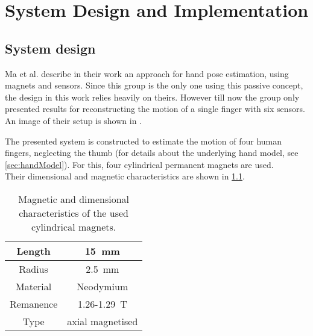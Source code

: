 \lhead[\chaptername~\thechapter]{\rightmark}

\rhead[\leftmark]{}

\lfoot[\thepage]{}

\cfoot{}

\rfoot[]{\thepage}

\chapter{System Design and Implementation} \label{cha:sysDesign}

\section{System design} \label{cha:design}

Ma et al. \cite{ma2010magnetic} describe in their work an approach for hand pose estimation, using magnets and sensors. Since this group is the only one using this passive concept, the design in this work relies heavily on theirs. However till now the group only presented results for reconstructing the motion of a single finger with six sensors. An image of their setup is shown in .

The presented system is constructed to estimate the motion of four human fingers, neglecting the thumb (for details about the underlying hand model, see \ref{sec:handModel}). For this, four cylindrical permanent magnets are used.\\
Their dimensional and magnetic characteristics are shown in \ref{tab:magDimensions}.
\begin{table}[h]
\centering
\begin{tabular}{|c|c|}
	\hline
	Length & \SI{15}{\mm} \\ \hline
	Radius & \SI{2.5}{\mm} \\ \hline 
	Material & Neodymium \\ \hline
	Remanence & 1.26-\SI{1.29}{\tesla} \\ \hline
	Type & axial magnetised \\ \hline
\end{tabular}
\caption{Magnetic and dimensional characteristics of the used cylindrical magnets.}
\label{tab:magDimensions}
\end{table}

